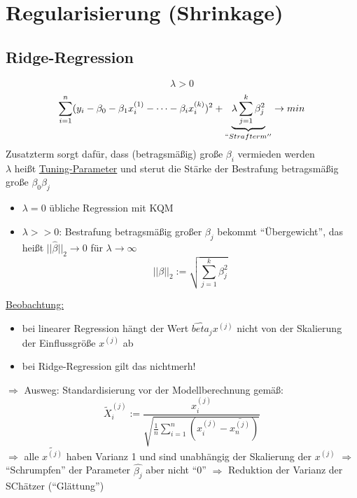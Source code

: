 \documentclass[10pt]{report}
\theoremstyle{definition}
\begin{document}
\section{Regularisierung (Shrinkage)}
\subsection{Ridge-Regression}
\[ \lambda > 0 \]
\[ \sum\limits_{i=1}^{n} (y_i - \beta_0 - \beta_1 x_i^{(1)} - \dots - \beta_i x_i^{(k)})^2 + \underbrace{\lambda \sum\limits_{j=1}^{k} \beta_j^{2}}_{``Strafterm''} \rightarrow min \]
	Zusatzterm sorgt dafür, dass (betragsmäßig) große $\beta_i$ vermieden werden \\
	$\lambda$ heißt \underline{Tuning-Parameter} und sterut die Stärke der Bestrafung betragsmäßig große $\beta_0 \beta_j$
	\begin{itemize}
		\item $\lambda=0$ übliche Regression mit KQM
		\item $\lambda >>0$: Bestrafung betragsmäßig großer $\beta_j$ bekommt ``Übergewicht'', das heißt $||\hat{\beta}||_2 \rightarrow 0 $ für $\lambda \rightarrow \infty $
			\[ ||\beta ||_2 := \sqrt{\sum\limits_{j=1}^{k}\beta_j^{2}} \]
	\end{itemize}
	\underline{Beobachtung:}
	\begin{itemize}
		\item bei linearer Regression hängt der Wert $\hat{beta}_j x^{(j)}$ nicht von der Skalierung der Einflussgröße $x^{(j)}$ ab
		\item bei Ridge-Regression gilt das nichtmerh!
	\end{itemize}
$\Rightarrow$ Ausweg: Standardisierung vor der Modellberechnung gemäß:
\[ \tilde{X}_i^{(j)} := \frac{x_i^{(j)}}{\sqrt{\frac{1}{n}\sum\limits_{i=1}^{n}(x_i^{(j)} - \bar{x^{(j)}_n})}} \]
$\Rightarrow $ alle $\tilde{x^{(j)}}$ haben Varianz 1 und sind unabhängig der Skalierung der $x^{(j)}$
$\Rightarrow$ ``Schrumpfen'' der Parameter $\hat{\beta_j}$ aber nicht ``0''
$\Rightarrow$ Reduktion der Varianz der SChätzer (``Glättung'')
\end{document}

